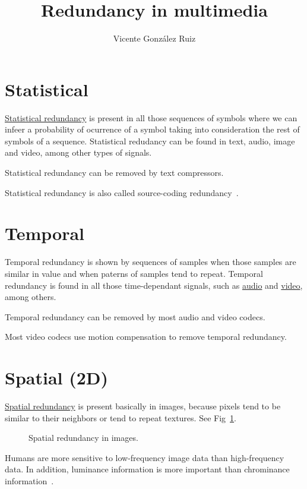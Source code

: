 
\title{Redundancy in multimedia}
\author{Vicente González Ruiz}
\maketitle

\section{Statistical}
\href{https://en.wikipedia.org/wiki/Redundancy_(information_theory)}{Statistical
  redundancy} is present in all those sequences of symbols where we
can infeer a probability of ocurrence of a symbol taking into
consideration the rest of symbols of a sequence. Statistical redudancy
can be found in text, audio, image and video, among other types of
signals.

Statistical redundancy can be removed by text compressors.

Statistical redundancy is also called source-coding redundancy~\cite{kondoz2009visual}.

\section{Temporal}
Temporal redundancy is shown by sequences of samples when those
samples are similar in value and when paterns of samples tend to
repeat. Temporal redundancy is found in all those time-dependant
signals, such as
\href{https://en.wikipedia.org/wiki/Inter_frame}{audio} and
\href{https://en.wikipedia.org/wiki/Inter_frame}{video}, among others.

Temporal redundancy can be removed by most audio and video codecs.

Most video codecs use motion compensation to remove temporal redundancy.

\section{Spatial (2D)}
\href{https://robbfoxx.wordpress.com/2015/07/12/discussion-6-2-1-what-is-redundancy-temporal-redundancy-and-spatial-redundancy/}{Spatial
  redundancy} is present basically in images, because pixels tend to
be similar to their neighbors or tend to repeat textures. See
Fig~\ref{fig:correlacion_lena}.

\begin{figure}
  \caption{Spatial redundancy in images.}
  \label{fig:correlacion_lena}
\end{figure}

Humans are more sensitive to low-frequency image data than high-frequency data. In addition, luminance information is more important than chrominance information~\cite{kondoz2009visual}.

%

